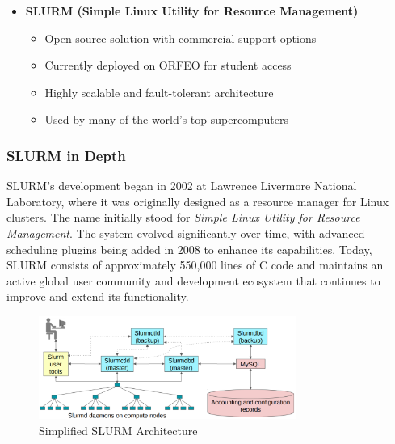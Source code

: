 \begin{itemize}
    \item \textbf{SLURM (Simple Linux Utility for Resource Management)}
    \begin{itemize}
        \item Open-source solution with commercial support options
        \item Currently deployed on ORFEO for student access
        \item Highly scalable and fault-tolerant architecture
        \item Used by many of the world's top supercomputers
    \end{itemize}
\end{itemize}

\subsubsection{SLURM in Depth}

SLURM's development began in 2002 at Lawrence Livermore National Laboratory, where it was originally designed as a resource manager for Linux clusters. The name initially stood for \textit{Simple Linux Utility for Resource Management}. The system evolved significantly over time, with advanced scheduling plugins being added in 2008 to enhance its capabilities. Today, SLURM consists of approximately 550,000 lines of C code and maintains an active global user community and development ecosystem that continues to improve and extend its functionality.

\begin{figure}[H]
    \centering
    \includegraphics[width=0.75\textwidth]{assets/slurm_architecture.png}
    \caption{Simplified SLURM Architecture}
    \label{fig:slurm_architecture}
\end{figure}

